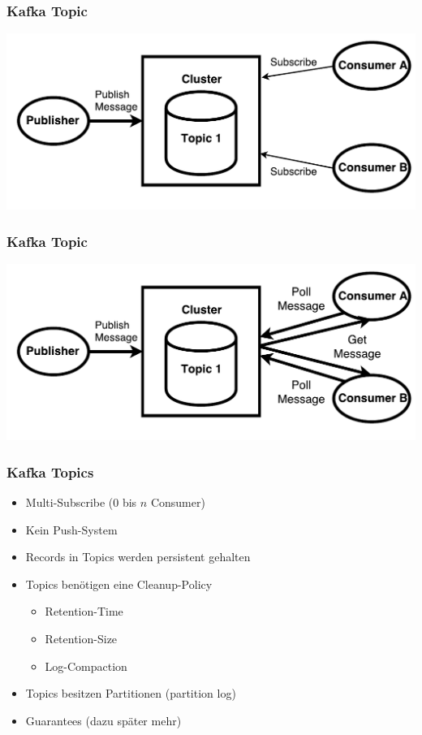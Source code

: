\begin{frame}
\frametitle{Kafka Topic}
\centering
\includegraphics[scale=0.6]{figure/Kafka_topic_draw_subscribe.pdf}
\end{frame}

\begin{frame}
\frametitle{Kafka Topic}
\centering
\includegraphics[scale=0.6]{figure/Kafka_topic_draw_Poll.pdf}
\end{frame}

\begin{frame}
\frametitle{Kafka Topics}
\begin{itemize}
	\item Multi-Subscribe ($0$ bis $n$ Consumer)		%
	\item Kein Push-System
	\item Records in Topics werden persistent gehalten
	\item Topics benötigen eine Cleanup-Policy
		\begin{itemize}
			\item Retention-Time
			\item Retention-Size
			\item Log-Compaction
		\end{itemize}
	\item Topics besitzen Partitionen (partition log)
	\item Guarantees (dazu später mehr)
\end{itemize}
\end{frame}

